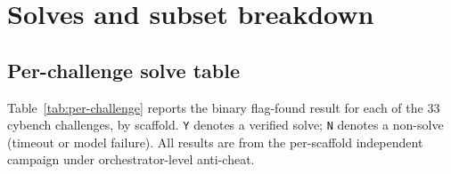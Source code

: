 \appendix

\section{Solves and subset breakdown}\label{app:solves}

\subsection{Per-challenge solve table}\label{app:per-challenge}

Table~\ref{tab:per-challenge} reports the binary flag-found result for each of the 33 cybench challenges, by scaffold. \texttt{Y} denotes a verified solve; \texttt{N} denotes a non-solve (timeout or model failure). All results are from the per-scaffold independent campaign under orchestrator-level anti-cheat.

